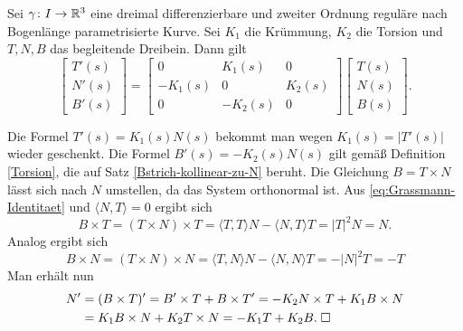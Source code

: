 \begin{theorem}
Sei $\gamma\colon I\to\mathbb R^3$ eine dreimal differenzierbare und zweiter
Ordnung reguläre nach Bogenlänge parametrisierte Kurve.
Sei $K_1$ die Krümmung, $K_2$ die Torsion und $T,N,B$ das begleitende
Dreibein. Dann gilt%
\begin{equation}
\begin{bmatrix}
T'(s)\\ N'(s)\\ B'(s)
\end{bmatrix}
= \begin{bmatrix}
0 & K_1(s) & 0\\
-K_1(s) & 0 & K_2(s)\\
0 & -K_2(s) & 0
\end{bmatrix}
\begin{bmatrix}
T(s)\\ N(s)\\ B(s)
\end{bmatrix}.
\end{equation}
\end{theorem}

\noindent{}
Die Formel $T'(s)=K_1(s)N(s)$ bekommt man wegen $K_1(s)=|T'(s)|$
wieder geschenkt. Die Formel $B'(s)=-K_2(s)N(s)$ gilt gemäß
Definition \ref{Torsion}, die auf Satz \ref{Bstrich-kollinear-zu-N}
beruht. Die Gleichung $B=T\times N$ lässt sich nach $N$ umstellen,
da das System orthonormal ist. Aus \eqref{eq:Grassmann-Identitaet}
und $\langle N,T\rangle=0$ ergibt sich
\begin{equation}
B\times T = (T\times N)\times T
= \langle T,T\rangle N - \langle N,T\rangle T
= |T|^2 N = N.
\end{equation}
Analog ergibt sich
\begin{equation}
B\times N = (T\times N)\times N
= \langle T,N\rangle N - \langle N,N\rangle T
= -|N|^2 T = -T
\end{equation}
Man erhält nun
\begin{align}
N' &= (B\times T)' = B'\times T+B\times T'
= -K_2 N\times T+K_1 B\times N\\
&= K_1 B\times N+K_2 T\times N
= -K_1 T + K_2 B.\;\Box
\end{align}
